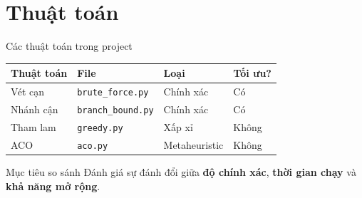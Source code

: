 \documentclass[aspectratio=169, 11pt]{beamer}
\begin{document}
\section{Thuật toán}

\begin{frame}{Các thuật toán trong project}
  \begin{table}
    \centering
    \begin{tabular}{p{3.1cm} p{3.2cm} p{2.6cm} p{2.4cm}}
      \toprule
      \textbf{Thuật toán} & \textbf{File} & \textbf{Loại} & \textbf{Tối ưu?} \\
      \midrule
      Vét cạn & \texttt{brute\_force.py} & Chính xác & Có \\
      Nhánh cận & \texttt{branch\_bound.py} & Chính xác & Có \\
      Tham lam & \texttt{greedy.py} & Xấp xỉ & Không \\
      ACO & \texttt{aco.py} & Metaheuristic & Không \\
      \bottomrule
    \end{tabular}
  \end{table}

  \begin{block}{Mục tiêu so sánh}
    Đánh giá sự đánh đổi giữa \textbf{độ chính xác}, \textbf{thời gian chạy} và \textbf{khả năng mở rộng}.
  \end{block}
\end{frame}
\end{document}
